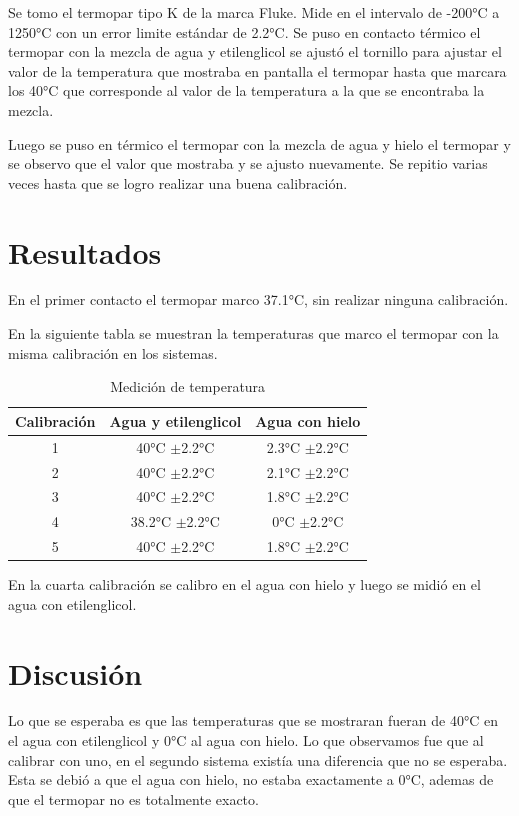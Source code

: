 \documentclass[12pt]{article}
\begin{document}
\hspace*{0.5cm}Se tomo el termopar  tipo K de la marca Fluke. Mide en el intervalo de -200°C a 1250°C con un error limite estándar de 2.2°C. Se puso en contacto térmico el termopar con la mezcla de agua y etilenglicol se ajustó el tornillo para ajustar el valor de la temperatura que mostraba en pantalla el termopar hasta que marcara los 40°C que corresponde al valor de la temperatura a la que se encontraba la mezcla.

\hspace*{0.5cm}Luego se puso en térmico el termopar con la mezcla de agua y hielo el termopar y se observo que el valor que mostraba y se ajusto nuevamente. Se repitio varias veces hasta que se logro realizar una buena calibración.

\pagebreak

\section{Resultados}
En el primer contacto el termopar marco 37.1°C, sin realizar ninguna calibración.

En la siguiente tabla se muestran la temperaturas que marco el termopar con la misma calibración en los sistemas.

\begin{table}[H]
\centering
\begin{tabular}{|c|c|c|}
\hline
Calibración &  Agua y etilenglicol &  Agua con hielo    \\ \hline
   1      &    40°C  $\pm$2.2°C  &   2.3°C $\pm$2.2°C   \\ \hline
   2      &    40°C  $\pm$2.2°C  &   2.1°C $\pm$2.2°C   \\ \hline
   3      &    40°C  $\pm$2.2°C  &   1.8°C $\pm$2.2°C   \\ \hline
   4      &   38.2°C $\pm$2.2°C  &     0°C $\pm$2.2°C   \\ \hline
   5      &    40°C  $\pm$2.2°C  &   1.8°C $\pm$2.2°C   \\ \hline   
\end{tabular}
\caption{Medición de temperatura}
\end{table}
En la cuarta calibración se calibro en el agua con hielo y luego se midió en el agua con etilenglicol.

\section{Discusión}
Lo que se esperaba es que las temperaturas que se mostraran fueran de 40°C en el agua con etilenglicol y 0°C al agua con hielo. Lo que observamos fue que al calibrar con uno, en el segundo sistema existía una diferencia que no se esperaba. Esta se debió a que el agua con hielo, no estaba exactamente a 0°C, ademas de que el termopar no es totalmente exacto.
\end{document}
